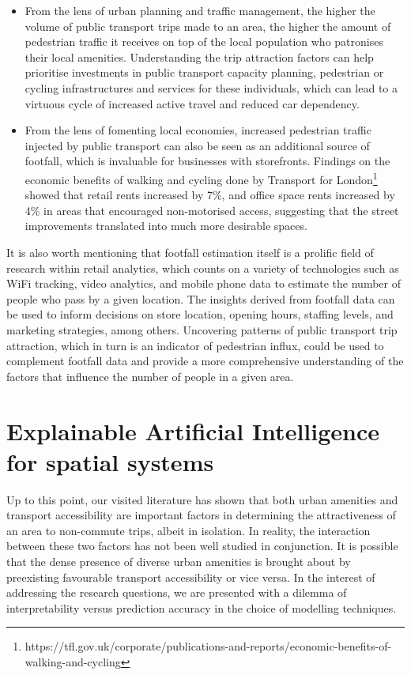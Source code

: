 \begin{itemize}
    \item From the lens of urban planning and traffic management, the higher the volume of public transport trips made to an area, the higher the amount of pedestrian traffic it receives on top of the local population who patronises their local amenities. Understanding the trip attraction factors can help prioritise investments in public transport capacity planning, pedestrian or cycling infrastructures and services for these individuals, which can lead to a virtuous cycle of increased active travel and reduced car dependency.
    \item From the lens of fomenting local economies, increased pedestrian traffic injected by public transport can also be seen as an additional source of footfall, which is invaluable for businesses with storefronts. Findings on the economic benefits of walking and cycling done by Transport for London\footnote{https://tfl.gov.uk/corporate/publications-and-reports/economic-benefits-of-walking-and-cycling} showed that retail rents increased by 7\%, and office space rents increased by 4\% in areas that encouraged non-motorised access, suggesting that the street improvements translated into much more desirable spaces.
\end{itemize}

It is also worth mentioning that footfall estimation itself is a prolific field of research within retail analytics, which counts on a variety of technologies such as WiFi tracking, video analytics, and mobile phone data to estimate the number of people who pass by a given location. The insights derived from footfall data can be used to inform decisions on store location, opening hours, staffing levels, and marketing strategies, among others. Uncovering patterns of public transport trip attraction, which in turn is an indicator of pedestrian influx, could be used to complement footfall data and provide a more comprehensive understanding of the factors that influence the number of people in a given area.

\section{Explainable Artificial Intelligence for spatial systems}

Up to this point, our visited literature has shown that both urban amenities and transport accessibility are important factors in determining the attractiveness of an area to non-commute trips, albeit in isolation. In reality, the interaction between these two factors has not been well studied in conjunction. It is possible that the dense presence of diverse urban amenities is brought about by preexisting favourable transport accessibility or vice versa. In the interest of addressing the research questions, we are presented with a dilemma of interpretability versus prediction accuracy in the choice of modelling techniques.


